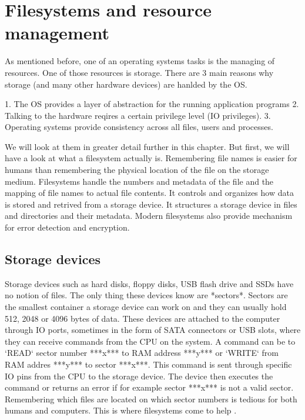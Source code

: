 \section{Filesystems and resource management}

As mentioned before, one of an operating systems tasks is the managing of resources.
One of those resources is storage. There are 3 main reasons why storage (and many other
hardware devices) are hanlded by the OS.

1. The OS provides a layer of abstraction for the running application programs
2. Talking to the hardware reqires a certain privilege level (IO privileges).
3. Operating systems provide consistency across all files, users and processes.

We will look at them in greater detail further in this chapter.
But first, we will have a look at what a filesystem actually is. Remembering file names is easier for
humans than remembering the physical location of the file on the storage medium. Filesystems handle
the numbers and metadata of the file and the mapping of file names to actual file contents. It
controls and organizes how data is stored and retrived from a storage device. It structures a storage
device in files and directories and their metadata. Modern filesystems also provide mechanism for
error detection and encryption.

\subsection{Storage devices}

Storage devices such as hard disks, floppy disks, USB flash drive and SSDs have no notion of files.
The only thing these devices know are *sectors*. Sectors are the smallest container a storage device
can work on and they can usually hold 512, 2048 or 4096 bytes of data. These devices are attached to
the computer through IO ports, sometimes in the form of SATA connectors or USB slots, where they can
receive commands from the CPU on the system. A command can be to `READ` sector number ***x*** to RAM
address ***y*** or `WRITE` from RAM addres ***y*** to sector ***x***. This command is sent through
specific IO pins from the CPU to the storage device. The device then executes the command or returns
an error if for example sector ***x*** is not a valid sector. Remembering which files are located on
which sector numbers is tedious for both humans and computers. This is where filesystems come to help
\cite{proc2}.

